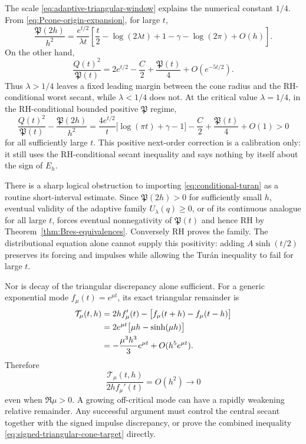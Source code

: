 \documentclass[11pt,a4paper]{article}
\numberwithin{equation}{section}
\theoremstyle{definition}
\begin{document}
The scale \eqref{eq:adaptive-triangular-window} explains the numerical
constant \(1/4\).  From \eqref{eq:Pcone-origin-expansion}, for large \(t\),
\begin{equation}\label{eq:small-window-Phi-scale}
 \frac{\mathfrak P(2h)}{h^2}
 =\frac{e^{t/2}}{\lambda t}
 \left[
   \frac t2-\log(2\lambda t)
   +1-\gamma-\log(2\pi)+O(h)
 \right].
\end{equation}
On the other hand,
\[
  \frac{Q(t)^2}{\mathfrak P(t)}
  =2e^{t/2}-\frac C2+\frac{\mathfrak P(t)}4
   +O(e^{-5t/2}).
\]
Thus \(\lambda>1/4\) leaves a fixed leading margin between the cone radius
and the RH-conditional worst secant, while \(\lambda<1/4\) does not.  At the
critical value \(\lambda=1/4\), in the RH-conditional bounded positive
\(\mathfrak P\) regime,
\begin{equation}\label{eq:critical-quarter-correction}
 \boxed{
 \frac{Q(t)^2}{\mathfrak P(t)}
 -\frac{\mathfrak P(2h)}{h^2}
 =\frac{4e^{t/2}}t\bigl[\log(\pi t)+\gamma-1\bigr]
  -\frac C2+\frac{\mathfrak P(t)}4+O(1)>0
 }
\end{equation}
for all sufficiently large \(t\).  This positive next-order correction is a
calibration only: it still uses the RH-conditional secant inequality and says
nothing by itself about the sign of \(E_h\).

There is a sharp logical obstruction to importing
\eqref{eq:conditional-turan} as a routine short-interval estimate.  Since
\(\mathfrak P(2h)>0\) for sufficiently small \(h\), eventual validity of the
adaptive family \(U_\lambda(q)\ge0\), or of its continuous analogue for all
large \(t\), forces eventual nonnegativity of \(\mathfrak P(t)\) and hence RH
by Theorem~\ref{thm:Bres-equivalences}.  Conversely RH proves the family.
The distributional equation alone cannot supply this positivity: adding
\(A\sinh(t/2)\) preserves its forcing and impulses while allowing the
Tur\'an inequality to fail for large \(t\).

Nor is decay of the triangular discrepancy alone sufficient.  For a generic
exponential mode \(f_\mu(t)=e^{\mu t}\), its exact triangular remainder is
\begin{align}
 \mathcal T_\mu(t,h)
 &=2hf_\mu'(t)-\bigl[f_\mu(t+h)-f_\mu(t-h)\bigr]\notag\\
 &=2e^{\mu t}\bigl[\mu h-\sinh(\mu h)\bigr]\notag\\
 &=-\frac{\mu^3h^3}{3}e^{\mu t}
   +O(h^5e^{\mu t}).
 \label{eq:exponential-triangular-no-go}
\end{align}
Therefore
\begin{equation}\label{eq:exponential-relative-no-go}
  \frac{\mathcal T_\mu(t,h)}{2hf_\mu'(t)}=O(h^2)\longrightarrow0
\end{equation}
even when \(\Re\mu>0\).  A growing off-critical mode can have a rapidly
weakening relative remainder.  Any successful argument must control the
central secant together with the signed impulse discrepancy, or prove the
combined inequality \eqref{eq:signed-triangular-cone-target} directly.
\end{document}

